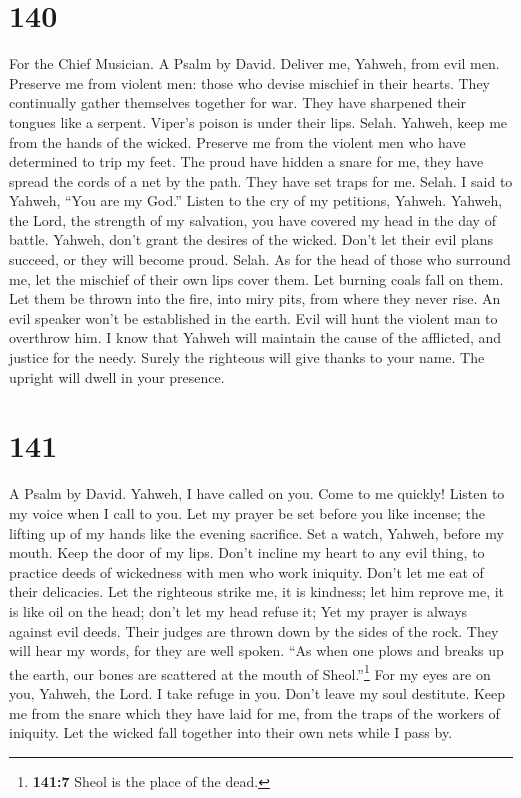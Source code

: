 \hypertarget{section-132}{%
\section{140}\label{section-132}}

For the Chief Musician. A Psalm by David.  Deliver me,
Yahweh, from evil men. Preserve me from violent men: 
those who devise mischief in their hearts. They continually gather
themselves together for war.  They have sharpened their
tongues like a serpent. Viper's poison is under their lips. Selah.
 Yahweh, keep me from the hands of the wicked. Preserve me
from the violent men who have determined to trip my feet. 
The proud have hidden a snare for me, they have spread the cords of a
net by the path. They have set traps for me. Selah.  I
said to Yahweh, ``You are my God.'' Listen to the cry of my petitions,
Yahweh.  Yahweh, the Lord, the strength of my salvation,
you have covered my head in the day of battle.  Yahweh,
don't grant the desires of the wicked. Don't let their evil plans
succeed, or they will become proud. Selah.  As for the
head of those who surround me, let the mischief of their own lips cover
them.  Let burning coals fall on them. Let them be thrown
into the fire, into miry pits, from where they never rise.
 An evil speaker won't be established in the earth. Evil
will hunt the violent man to overthrow him.  I know that
Yahweh will maintain the cause of the afflicted, and justice for the
needy.  Surely the righteous will give thanks to your
name. The upright will dwell in your presence.

\hypertarget{section-133}{%
\section{141}\label{section-133}}

A Psalm by David.  Yahweh, I have called on you. Come to
me quickly! Listen to my voice when I call to you.  Let my
prayer be set before you like incense; the lifting up of my hands like
the evening sacrifice.  Set a watch, Yahweh, before my
mouth. Keep the door of my lips.  Don't incline my heart
to any evil thing, to practice deeds of wickedness with men who work
iniquity. Don't let me eat of their delicacies.  Let the
righteous strike me, it is kindness; let him reprove me, it is like oil
on the head; don't let my head refuse it; Yet my prayer is always
against evil deeds.  Their judges are thrown down by the
sides of the rock. They will hear my words, for they are well spoken.
 ``As when one plows and breaks up the earth, our bones
are scattered at the mouth of Sheol.''\footnote{\textbf{141:7} Sheol is
  the place of the dead.}  For my eyes are on you, Yahweh,
the Lord. I take refuge in you. Don't leave my soul destitute.
 Keep me from the snare which they have laid for me, from
the traps of the workers of iniquity.  Let the wicked
fall together into their own nets while I pass by.

